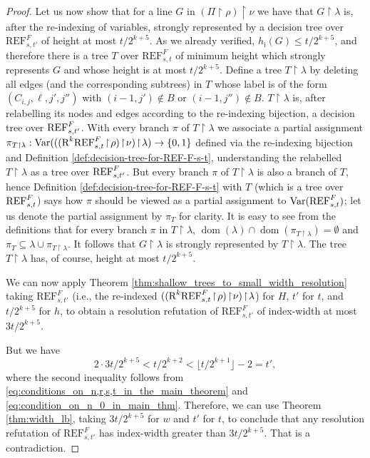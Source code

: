 \documentclass[10pt,a4paper]{article}
\theoremstyle{remark}
\newtheorem*{switching lemma}{Switching Lemma}
\newtheorem*{open problem}{Open Problem}
\theoremstyle{definition}
\DeclareMathOperator{\dom}{dom}
\begin{document}
\begin{proof}
Let us now show that for a line $G$ in $(\Pi \! \restriction \! \rho) \! \restriction \! \nu$ we have that $G \! \restriction \! \lambda$ is, after the re-indexing of variables, strongly represented by a decision tree over $\text{REF}^F_{s,t'}$ of height at most $t/2^{k+5}$. As we already verified, $h_{\text{i}}(G) \leq t/2^{k+5}$, and therefore there is a tree $T$ over $\text{REF}^F_{s,t}$ of minimum height which strongly represents $G$ and whose height is at most $t/2^{k+5}$. Define a tree $T \! \restriction \! \lambda$ by deleting all edges (and the corresponding subtrees) in $T$ whose label is of the form $(C_{i,j}, \ell, j', j'')$ with $(i-1,j') \notin B$ or $(i-1,j'') \notin B$. $T \! \restriction \! \lambda$ is, after relabelling its nodes and edges according to the re-indexing bijection, a decision tree over $\textnormal{REF}^{F}_{s,t'}$. With every branch $\pi$ of $T \! \restriction \! \lambda$ we associate a partial assignment $\pi_{T \restriction \lambda}: \text{Var}(((\textnormal{R}^k\textnormal{REF}^{F}_{s,t} \! \restriction \! \rho) \! \restriction \! \nu) \! \restriction \! \lambda) \rightarrow \{0,1\}$ defined via the re-indexing bijection and Definition \ref{def:decision-tree-for-REF-F-s-t}, understanding the relabelled $T \! \restriction \! \lambda$ as a tree over $\textnormal{REF}^{F}_{s,t'}$. But every branch $\pi$ of $T \! \restriction \! \lambda$ is also a branch of $T$, hence Definition \ref{def:decision-tree-for-REF-F-s-t} with $T$ (which is a tree over $\textnormal{REF}^{F}_{s,t}$) says how $\pi$ should be viewed as a partial assignment to $\text{Var}(\textnormal{REF}^{F}_{s,t})$; let us denote the partial assignment by $\pi_T$ for clarity. It is easy to see from the definitions that for every branch $\pi$ in $T \! \restriction \! \lambda$, $\dom(\lambda) \cap \dom(\pi_{T \restriction \lambda}) = \emptyset$ and $\pi_T \subseteq \lambda \cup \pi_{T \restriction \lambda}$. It follows that $G \! \restriction \! \lambda$ is strongly represented by $T \! \restriction \! \lambda$. The tree $T \! \restriction \! \lambda$ has, of course, height at most $t/2^{k+5}$. 

We can now apply Theorem \ref{thm:shallow_trees_to_small_width_resolution} taking $\text{REF}^F_{s,t'}$ (i.e., the re-indexed $((\textnormal{R}^k\textnormal{REF}^{F}_{s,t} \! \restriction \! \rho) \! \restriction \! \nu) \! \restriction \! \lambda$) for $H$, $t'$ for $t$, and $t/2^{k+5}$ for $h$, to obtain a resolution refutation of $\text{REF}^F_{s,t'}$ of index-width at most $3t/2^{k+5}$. 

But we have 
\begin{equation*}
2 \cdot 3t/2^{k+5} < t/2^{k+2} <  \lfloor t/2^{k+1} \rfloor - 2 = t',
\end{equation*}
where the second inequality follows from \ref{eq:conditions_on_n,r,s,t_in_the_main_theorem} and \ref{eq:condition_on_n_0_in_main_thm}. Therefore, we can use Theorem \ref{thm:width_lb}, taking $3t/2^{k+5}$ for $w$ and $t'$ for $t$, to conclude that any resolution refutation of $\text{REF}^F_{s,t'}$ has index-width greater than $3t/2^{k+5}$. That is a contradiction.
\end{proof}
\end{document}
